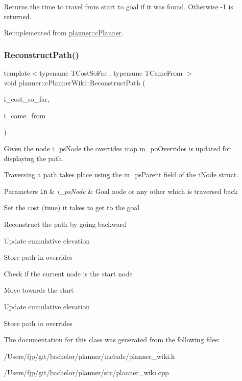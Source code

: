 \begin{DoxyReturn}{Returns}
the time to travel from start to goal if it was found. Otherwise -\/1 is returned. 
\end{DoxyReturn}


Reimplemented from \mbox{\hyperlink{classplanner_1_1c_planner_a21230c015260b9fc34ad2f239592470e}{planner\+::c\+Planner}}.

\mbox{\label{classplanner_1_1c_planner_wiki_a049e5c4a9540fecbe82a0648f771bbd2}} 
\subsubsection{\texorpdfstring{Reconstruct\+Path()}{ReconstructPath()}}
{\footnotesize\ttfamily template$<$typename T\+Cost\+So\+Far , typename T\+Came\+From $>$ \\
void planner\+::c\+Planner\+Wiki\+::\+Reconstruct\+Path (\begin{DoxyParamCaption}\item[{T\+Cost\+So\+Far \&\&}]{i\+\_\+cost\+\_\+so\+\_\+far,  }\item[{T\+Came\+From \&\&}]{i\+\_\+came\+\_\+from }\end{DoxyParamCaption})}



Given the node i\+\_\+ps\+Node the overrides map m\+\_\+po\+Overrides is updated for displaying the path. 

Traversing a path takes place using the m\+\_\+ps\+Parent field of the \mbox{\hyperlink{structplanner_1_1t_node}{t\+Node}} struct. 
\begin{DoxyParams}[1]{Parameters}
\mbox{\tt in}  & {\em i\+\_\+ps\+Node} & Goal node or any other which is traversed back \\
\hline
\end{DoxyParams}
Set the cost (time) it takes to get to the goal

Reconstruct the path by going backward

Update cumulative elevation

Store path in overrides

Check if the current node is the start node

Move towards the start

Update cumulative elevation

Store path in overrides 

The documentation for this class was generated from the following files\+:\begin{DoxyCompactItemize}
\item 
/\+Users/fjp/git/bachelor/planner/include/planner\+\_\+wiki.\+h\item 
/\+Users/fjp/git/bachelor/planner/src/planner\+\_\+wiki.\+cpp\end{DoxyCompactItemize}
